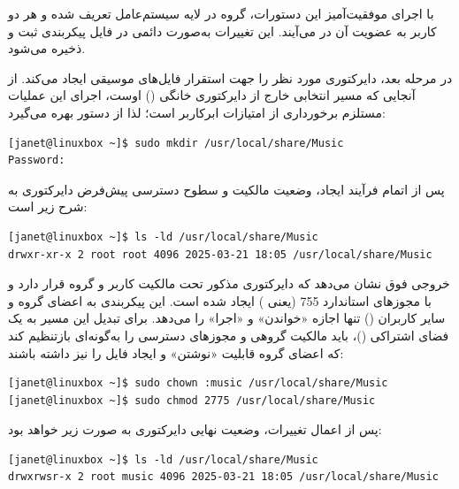 با اجرای موفقیت‌آمیز این دستورات، گروه  در لایه سیستم‌عامل تعریف شده و هر دو کاربر به عضویت آن در می‌آیند. این تغییرات به‌صورت دائمی در فایل پیکربندی  ثبت و ذخیره می‌شود.

در مرحله بعد،  دایرکتوری مورد نظر را جهت استقرار فایل‌های موسیقی ایجاد می‌کند. از آنجایی که مسیر انتخابی خارج از دایرکتوری خانگی () اوست، اجرای این عملیات مستلزم برخورداری از امتیازات ابرکاربر است؛ لذا  از دستور  بهره می‌گیرد:

\begin{latin}
\begin{lstlisting}
[janet@linuxbox ~]$ sudo mkdir /usr/local/share/Music
Password:
\end{lstlisting}
\end{latin}

پس از اتمام فرآیند ایجاد، وضعیت مالکیت و سطوح دسترسی پیش‌فرض دایرکتوری به شرح زیر است:

\begin{latin}
\begin{lstlisting}
[janet@linuxbox ~]$ ls -ld /usr/local/share/Music
drwxr-xr-x 2 root root 4096 2025-03-21 18:05 /usr/local/share/Music
\end{lstlisting}
\end{latin}

خروجی فوق نشان می‌دهد که دایرکتوری مذکور تحت مالکیت کاربر  و گروه  قرار دارد و با مجوزهای استاندارد 755 (یعنی ) ایجاد شده است. این پیکربندی به اعضای گروه و سایر کاربران () تنها اجازه «خواندن» و «اجرا» را می‌دهد. برای تبدیل این مسیر به یک فضای اشتراکی ()،  باید مالکیت گروهی و مجوزهای دسترسی را به‌گونه‌ای بازتنظیم کند که اعضای گروه  قابلیت «نوشتن» و ایجاد فایل را نیز داشته باشند:

\begin{latin}
\begin{lstlisting}
[janet@linuxbox ~]$ sudo chown :music /usr/local/share/Music
[janet@linuxbox ~]$ sudo chmod 2775 /usr/local/share/Music
\end{lstlisting}
\end{latin}

پس از اعمال تغییرات، وضعیت نهایی دایرکتوری به صورت زیر خواهد بود:

\begin{latin}
\begin{lstlisting}
[janet@linuxbox ~]$ ls -ld /usr/local/share/Music
drwxrwsr-x 2 root music 4096 2025-03-21 18:05 /usr/local/share/Music
\end{lstlisting}
\end{latin}

